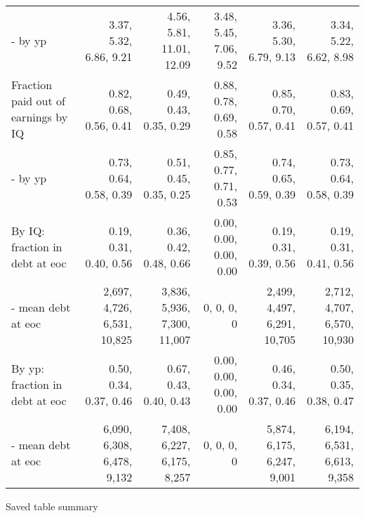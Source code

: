 \begin{tabular}{lrrrrr}
- by yp & 3.37, 5.32, 6.86, 9.21  & 4.56, 5.81, 11.01, 12.09  & 3.48, 5.45, 7.06, 9.52  & 3.36, 5.30, 6.79, 9.13  & 3.34, 5.22, 6.62, 8.98  \\ 
Fraction paid out of earnings by IQ & 0.82, 0.68, 0.56, 0.41  & 0.49, 0.43, 0.35, 0.29  & 0.88, 0.78, 0.69, 0.58  & 0.85, 0.70, 0.57, 0.41  & 0.83, 0.69, 0.57, 0.41  \\ 
- by yp & 0.73, 0.64, 0.58, 0.39  & 0.51, 0.45, 0.35, 0.25  & 0.85, 0.77, 0.71, 0.53  & 0.74, 0.65, 0.59, 0.39  & 0.73, 0.64, 0.58, 0.39  \\ 
By IQ: fraction in debt at eoc & 0.19, 0.31, 0.40, 0.56  & 0.36, 0.42, 0.48, 0.66  & 0.00, 0.00, 0.00, 0.00  & 0.19, 0.31, 0.39, 0.56  & 0.19, 0.31, 0.41, 0.56  \\ 
- mean debt at eoc & 2,697, 4,726, 6,531, 10,825  & 3,836, 5,936, 7,300, 11,007  & 0, 0, 0, 0  & 2,499, 4,497, 6,291, 10,705  & 2,712, 4,707, 6,570, 10,930  \\ 
By yp: fraction in debt at eoc & 0.50, 0.34, 0.37, 0.46  & 0.67, 0.43, 0.40, 0.43  & 0.00, 0.00, 0.00, 0.00  & 0.46, 0.34, 0.37, 0.46  & 0.50, 0.35, 0.38, 0.47  \\ 
- mean debt at eoc & 6,090, 6,308, 6,478, 9,132  & 7,408, 6,227, 6,175, 8,257  & 0, 0, 0, 0  & 5,874, 6,175, 6,247, 9,001  & 6,194, 6,531, 6,613, 9,358  \\ 
\hline
\end{tabular}%
Saved table summary

